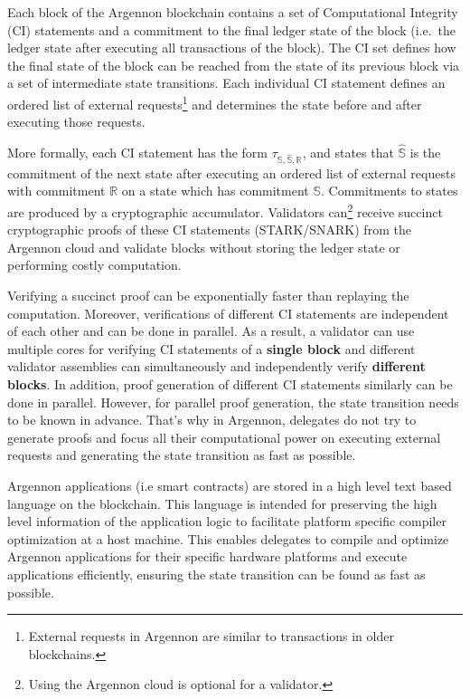 Each block of the Argennon blockchain contains a set of Computational Integrity (CI) statements and a commitment to
the final ledger state of the block (i.e.\ the ledger state after executing all transactions of the block). The CI
set defines how the final state of the block can be reached from
the state of its previous block via a set of intermediate state transitions. Each individual CI statement defines
an ordered list of external requests\footnote{External requests in Argennon are
similar to transactions in older blockchains.} and determines the state before and after executing those requests.

More formally, each CI statement has the form $\tau_{\mathbb{S}, \hat{\mathbb{S}}, \mathbb{R}}$, and states that
$\hat{\mathbb{S}}$ is the commitment of the next state after executing an ordered list of external requests with
commitment $\mathbb{R}$ on a state which has commitment $\mathbb{S}$.
Commitments to states are produced by a cryptographic accumulator.
Validators can\footnote{Using the Argennon cloud is optional for a validator.} receive succinct cryptographic proofs
of these CI statements (STARK/SNARK) from the Argennon cloud and validate blocks without storing the ledger state
or performing costly computation.

Verifying a succinct proof can be exponentially faster than replaying the computation. Moreover, verifications of
different CI statements are independent of each other and can be done in parallel. As a result, a validator can use
multiple cores for verifying CI statements of a \textbf{single block} and different validator assemblies can
simultaneously and
independently verify \textbf{different blocks}.
In addition, proof generation of different CI statements similarly can be done in parallel. However, for parallel
proof generation, the state transition needs to be known in advance. That's why in Argennon, delegates do not try
to generate proofs and focus all their computational power on executing external requests and
generating the state transition as fast as possible.

Argennon applications (i.e smart contracts) are stored in a high level text based language on the blockchain. This
language is intended for preserving the
high level information of the application logic to facilitate platform specific compiler optimization at a host
machine. This enables delegates to compile and optimize Argennon applications for their specific hardware platforms
and execute applications efficiently, ensuring the state transition can be found as fast as possible.

